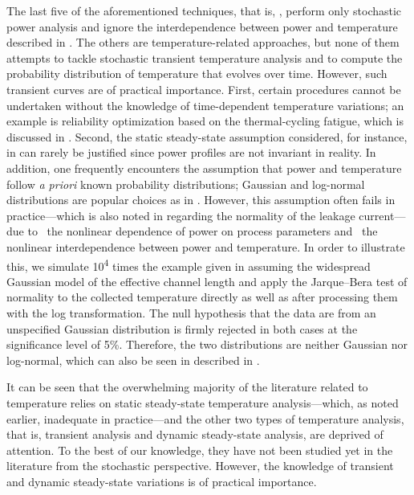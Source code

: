 The last five of the aforementioned techniques, that is, \cite{bhardwaj2006,
vrudhula2006, ghanta2006, bhardwaj2008, shen2009}, perform only stochastic power
analysis and ignore the interdependence between power and temperature described
in . The others are temperature-related approaches, but none
of them attempts to tackle stochastic transient temperature analysis and to
compute the probability distribution of temperature that evolves over time.
However, such transient curves are of practical importance. First, certain
procedures cannot be undertaken without the knowledge of time-dependent
temperature variations; an example is reliability optimization based on the
thermal-cycling fatigue, which is discussed in .
Second, the static steady-state assumption considered, for instance, in
\cite{huang2009a, juan2011, juan2012, lee2013} can rarely be justified since
power profiles are not invariant in reality. In addition, one frequently
encounters the assumption that power and temperature follow \emph{a priori}
known probability distributions; Gaussian and log-normal distributions are
popular choices as in \cite{bhardwaj2006, srivastava2010, juan2012}. However,
this assumption often fails in practice---which is also noted in \cite{juan2012}
regarding the normality of the leakage current---due to \one~the nonlinear
dependence of power on process parameters and \two~the nonlinear interdependence
between power and temperature. In order to illustrate this, we simulate
10\textsuperscript{4} times the example given in 
assuming the widespread Gaussian model of the effective channel length and apply
the Jarque--Bera test of normality to the collected temperature directly as well
as after processing them with the log transformation. The null hypothesis that
the data are from an unspecified Gaussian distribution is firmly rejected in
both cases at the significance level of 5\%. Therefore, the two distributions
are neither Gaussian nor log-normal, which can also be seen in
 described in .

It can be seen that the overwhelming majority of the literature related to
temperature relies on static steady-state temperature analysis---which, as noted
earlier, inadequate in practice---and the other two types of temperature
analysis, that is, transient analysis and dynamic steady-state analysis, are
deprived of attention. To the best of our knowledge, they have not been studied
yet in the literature from the stochastic perspective. However, the knowledge of
transient and dynamic steady-state variations is of practical importance.

